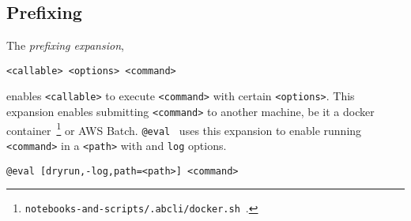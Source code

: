 \subsection{Prefixing}\label{prefixing}

The \emph{prefixing expansion},
%
\begin{verbatim}
<callable> <options> <command>
\end{verbatim}
%
enables \texttt{<callable>} to execute \texttt{<command>} with certain \texttt{<options>}. This expansion enables submitting \texttt{<command>} to another machine, be it a docker container~\footnote{\texttt{notebooks-and-scripts/.abcli/docker.sh}~\cite{notebooks_and_scripts}.} or AWS Batch. \texttt{@eval}~ uses this expansion to enable running \texttt{<command>} in a \texttt{<path>} with  and \texttt{log} options.
%
\begin{verbatim}
@eval [dryrun,-log,path=<path>] <command>
\end{verbatim}